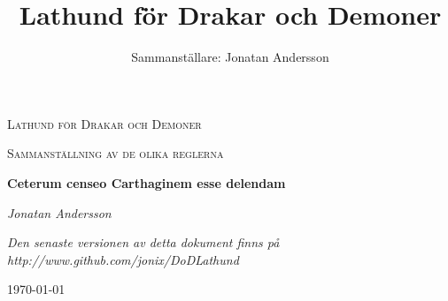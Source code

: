 \documentclass[a4paper, 10pt, titlepage]{article}
\title{Lathund för Drakar och Demoner}
\author{Sammanställare: Jonatan Andersson}
\date{ }
\begin{document}
\begin{titlepage}
        \centering
        {\scshape\LARGE Lathund för Drakar och Demoner \par}
        \vspace{1cm}
        {\scshape\Large Sammanställning av de olika reglerna\par}
        \vspace{1.5cm}
        {\huge\bfseries Ceterum censeo Carthaginem esse delendam\par}
        \vspace{2cm}
        {\Large\itshape Jonatan Andersson\par}
        \vspace{2cm}
        {\small\itshape Den senaste versionen av detta dokument finns på http://www.github.com/jonix/DoDLathund\par}
        \vfill
        {\large \today\par}
        \vfill


\end{titlepage}

\end{document}
